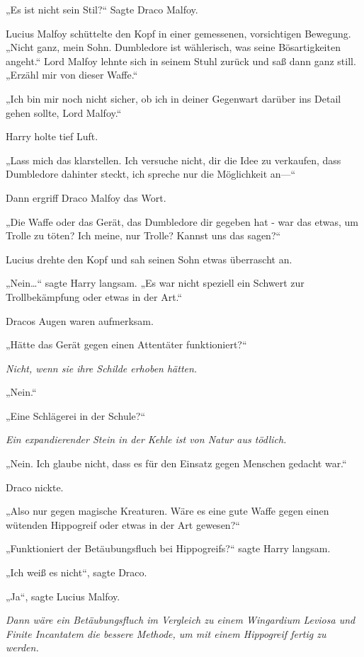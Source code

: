 {„Es ist nicht sein Stil?“ Sagte Draco Malfoy.

Lucius Malfoy schüttelte den Kopf in einer gemessenen, vorsichtigen Bewegung. „Nicht ganz, mein Sohn. Dumbledore ist wählerisch, was seine Bösartigkeiten angeht.“ Lord Malfoy lehnte sich in seinem Stuhl zurück und saß dann ganz still. „Erzähl mir von dieser Waffe.“

„Ich bin mir noch nicht sicher, ob ich in deiner Gegenwart darüber ins Detail gehen sollte, Lord Malfoy.“

Harry holte tief Luft.

„Lass mich das klarstellen. Ich versuche nicht, dir die Idee zu verkaufen, dass Dumbledore dahinter steckt, ich spreche nur die Möglichkeit an—“

Dann ergriff Draco Malfoy das Wort.

„Die Waffe oder das Gerät, das Dumbledore dir gegeben hat - war das etwas, um Trolle zu töten? Ich meine, nur Trolle? Kannst uns das sagen?“

Lucius drehte den Kopf und sah seinen Sohn etwas überrascht an.

„Nein…“ sagte Harry langsam. „Es war nicht speziell ein Schwert zur Trollbekämpfung oder etwas in der Art.“

Dracos Augen waren aufmerksam.

„Hätte das Gerät gegen einen Attentäter funktioniert?“

\emph{Nicht, wenn sie ihre Schilde erhoben hätten.}

„Nein.“

„Eine Schlägerei in der Schule?“

\emph{Ein expandierender Stein in der Kehle ist von Natur aus tödlich.}

„Nein. Ich glaube nicht, dass es für den Einsatz gegen Menschen gedacht war.“

Draco nickte.

„Also nur gegen magische Kreaturen. Wäre es eine gute Waffe gegen einen wütenden Hippogreif oder etwas in der Art gewesen?“

„Funktioniert der Betäubungsfluch bei Hippogreifs?“ sagte Harry langsam.

„Ich weiß es nicht“, sagte Draco.

„Ja“, sagte Lucius Malfoy.

\emph{Dann wäre ein Betäubungsfluch im Vergleich zu einem Wingardium Leviosa und Finite Incantatem die bessere Methode, um mit einem Hippogreif fertig zu werden.}

}
